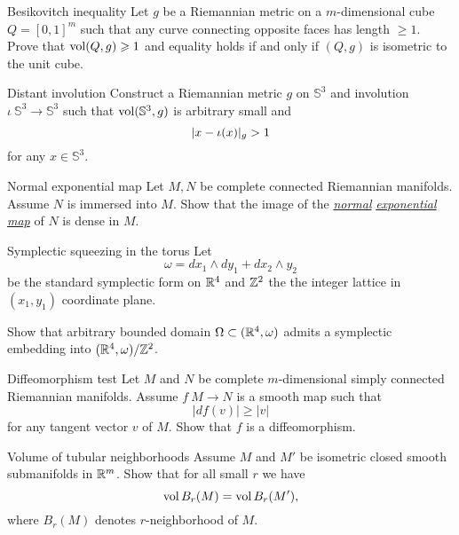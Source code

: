 \documentclass[twoside]{book}
\begin{document}
\begin{pr}{}{Besikovitch inequality}\label{Besikovitch inequality}
Let $g$ be a Riemannian metric on a $m$-dimensional cube $Q=[0,1]^m$ such that any curve connecting opposite faces has length $\ge 1$. 
Prove that $\operatorname{\rm vol}(Q,g)\geqslant 1$ and equality holds if and only if $(Q,g)$ is isometric to the unit cube.
\end{pr}

\begin{pr}{}{Distant involution}\label{Distant involution}
Construct a Riemannian metric $g$ on $\mathbb{S}^3$ and involution $\iota\:\mathbb{S}^3\to\mathbb{S}^3$ such that $\operatorname{\rm vol} (\mathbb{S}^3,g)$ is arbitrary small and 
\[|x\z-\iota(x)|_g>1\]
 for any $x\in\mathbb{S}^3$.
\end{pr}




\begin{pr}{\easy}{Normal exponential map}\label{Normal exponential map}
Let $M,N$ be complete connected Riemannian manifolds.
Assume $N$ is immersed into $M$.
Show that the image  of the 
\hyperref[Exponential map]{\emph{normal}} 
\hyperref[Exponential map]{\emph{exponential}} 
\hyperref[Exponential map]{\emph{map}} of $N$ is dense in $M$.
\end{pr}


\begin{pr}{}{Symplectic squeezing in the torus}\label{Symplectic squeezing in the torus}
Let 
\[\omega=dx_1\wedge dy_1+ dx_2\wedge y_2\]
be the standard symplectic form on $\mathbb{R}^4$
and $\mathbb{Z}^2$ the the integer lattice in $(x_1,y_1)$ coordinate plane.

Show that arbitrary bounded domain $\Omega\subset (\mathbb{R}^4,\omega)$
admits a symplectic embedding into $(\mathbb{R}^4,\omega)/\mathbb{Z}^2$. 
\end{pr}


\begin{pr}{\easy}{Diffeomorphism test}\label{Diffeomorphism test}
Let $M$ and $N$ be 
complete 
$m$-dimensional
simply connected 
Riemannian manifolds.
Assume $f\:M\to N$
is a smooth map such that 
$$|df(v)|\ge |v|$$
for any tangent vector $v$ of $M$.
Show that $f$ is a diffeomorphism.
\end{pr}

\begin{pr}{}{Volume of tubular neighborhoods}\label{Volume of tubular neighborhoods}
Assume $M$ and $M'$ be isometric closed smooth submanifolds in $\mathbb{R}^m$.
Show that for all small $r$ we have
$$\operatorname{\rm vol} B_r(M)=\operatorname{\rm vol} B_r(M'),$$
where $B_r(M)$ denotes $r$-neighborhood of $M$.
\end{pr}
\end{document}
